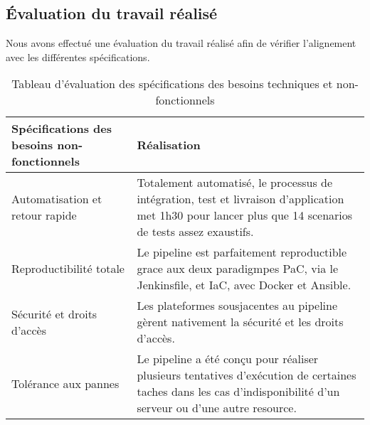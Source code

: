 \begin{spacing}{1.2}
\subsection{Évaluation du travail réalisé}
Nous avons effectué une évaluation du travail réalisé afin de vérifier l’alignement avec les différentes spécifications.
\begin{table}[ht]
	\centering
	\caption{Tableau d’évaluation des spécifications des besoins techniques et non-fonctionnels}
	\footnotesize
	\begin{tabularx}{\textwidth}{|p{4.2cm}|X|}
          \hline 
          {\textbf{Spécifications des besoins non-fonctionnels}} & \multicolumn{1}{T|}{{\textbf{Réalisation}}} \\
          \hline
           Automatisation et retour rapide & Totalement automatisé, le processus de intégration, test et livraison d'application met 1h30 pour lancer plus que 14 scenarios de tests assez exaustifs.\\
           \hline
           Reproductibilité totale & Le pipeline est parfaitement reproductible grace aux deux paradigmpes PaC, via le Jenkinsfile, et IaC, avec Docker et Ansible. \\
           \hline
           Sécurité et droits d’accès & Les plateformes sousjacentes au pipeline gèrent nativement la sécurité et les droits d'accès.\\
           \hline
           Tolérance aux pannes & Le pipeline a été conçu pour réaliser plusieurs tentatives d'exécution de certaines taches dans les cas d'indisponibilité d'un serveur ou d'une autre resource.\\
          \hline
        \end{tabularx}
	\label{tab:exple}
\end{table}
\FloatBarrier
\vspace{-5mm}

\end{spacing}
